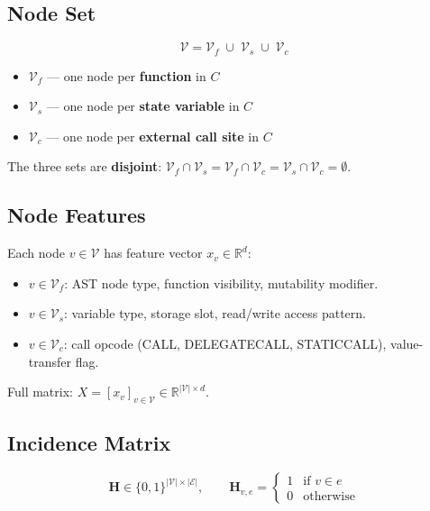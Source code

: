 \documentclass[11pt]{article}
\begin{document}
\subsection{Node Set}
\label{sec:nodeset}

\[
\mathcal{V} = \mathcal{V}_f \;\cup\; \mathcal{V}_s \;\cup\; \mathcal{V}_c
\]

\begin{itemize}
    \item $\mathcal{V}_f$ --- one node per \textbf{function} in $C$
    \item $\mathcal{V}_s$ --- one node per \textbf{state variable} in $C$
    \item $\mathcal{V}_c$ --- one node per \textbf{external call site} in $C$
\end{itemize}

The three sets are \textbf{disjoint}: $\mathcal{V}_f \cap \mathcal{V}_s = \mathcal{V}_f \cap \mathcal{V}_c = \mathcal{V}_s \cap \mathcal{V}_c = \emptyset$.

\subsection{Node Features}
\label{sec:nodefeatures}

Each node $v \in \mathcal{V}$ has feature vector $x_v \in \mathbb{R}^d$:

\begin{itemize}
    \item $v \in \mathcal{V}_f$: AST node type, function visibility, mutability modifier.
    \item $v \in \mathcal{V}_s$: variable type, storage slot, read/write access pattern.
    \item $v \in \mathcal{V}_c$: call opcode (CALL, DELEGATECALL, STATICCALL), value-transfer flag.
\end{itemize}

Full matrix: $X = [x_v]_{v \in \mathcal{V}} \in \mathbb{R}^{|\mathcal{V}| \times d}$.

\subsection{Incidence Matrix}

\[
\mathbf{H} \in \{0,1\}^{|\mathcal{V}| \times |\mathcal{E}|}, \qquad
\mathbf{H}_{v,e} =
\begin{cases}
1 & \text{if } v \in e \\
0 & \text{otherwise}
\end{cases}
\]
\end{document}
